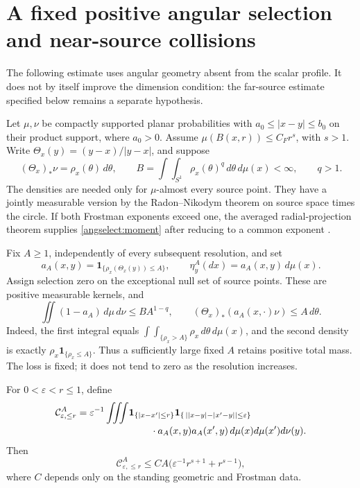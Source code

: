 \section{A fixed positive angular selection and near-source collisions}
\label{angselect:section}

The following estimate uses angular geometry absent from the scalar
profile. It does not by itself improve the dimension condition: the
far-source estimate specified below remains a separate hypothesis.

Let \(\mu,\nu\) be compactly supported planar probabilities with
\(a_0\le |x-y|\le b_0\) on their product support, where \(a_0>0\).
Assume \(\mu(B(x,r))\le C_F r^s\), with \(s>1\). Write
\(\Theta_x(y)=(y-x)/|y-x|\), and suppose
\begin{equation}\label{angselect:moment}
 (\Theta_x)_*\nu=\rho_x(\theta)\,d\theta,
 \qquad
 B=\int\!\int_{S^1}\rho_x(\theta)^q\,d\theta\,d\mu(x)<\infty,
 \qquad q>1.
\end{equation}
The densities are needed only for \(\mu\)-almost every source point.
They have a jointly measurable version by the Radon--Nikodym theorem
on source space times the circle. If both Frostman exponents exceed
one, the averaged radial-projection theorem supplies
\eqref{angselect:moment} after reducing to a common exponent
\cite[Theorem 3.7]{giow}.

Fix \(A\ge1\), independently of every subsequent resolution, and set
\[
 a_A(x,y)=\mathbf1_{\{\rho_x(\Theta_x(y))\le A\}},
 \qquad \eta_y^A(dx)=a_A(x,y)\,d\mu(x).
\]
Assign selection zero on the exceptional null set of source points.
These are positive measurable kernels, and
\begin{equation}\label{angselect:mass}
 \iint(1-a_A)\,d\mu\,d\nu\le B A^{1-q},
 \qquad
 (\Theta_x)_*(a_A(x,\cdot)\nu)\le A\,d\theta.
\end{equation}
Indeed, the first integral equals
\(\int\!\int_{\{\rho_x>A\}}\rho_x\,d\theta\,d\mu(x)\),
and the second density is exactly
\(\rho_x\mathbf1_{\{\rho_x\le A\}}\).
Thus a sufficiently large fixed \(A\) retains positive total mass.
The loss is fixed; it does not tend to zero as the resolution increases.

\begin{proposition}
\label{angselect:nearprop}
For \(0<\varepsilon<r\le1\), define
\begin{align*}
 \mathcal C^A_{\varepsilon,\le r}
 =\varepsilon^{-1}\iiint
 &\mathbf1_{\{|x-x'|\le r\}}
 \mathbf1_{\{\,||x-y|-|x'-y||\le\varepsilon\}}\\[-2pt]
 &\hspace{8mm}\cdot a_A(x,y)a_A(x',y)
 \,d\mu(x)d\mu(x')d\nu(y).
\end{align*}
Then
\begin{equation}\label{angselect:nearbound}
 \mathcal C^A_{\varepsilon,\le r}
 \le C A\bigl(\varepsilon^{-1}r^{s+1}+r^{s-1}\bigr),
\end{equation}
where \(C\) depends only on the standing geometric and Frostman data.
\end{proposition}

